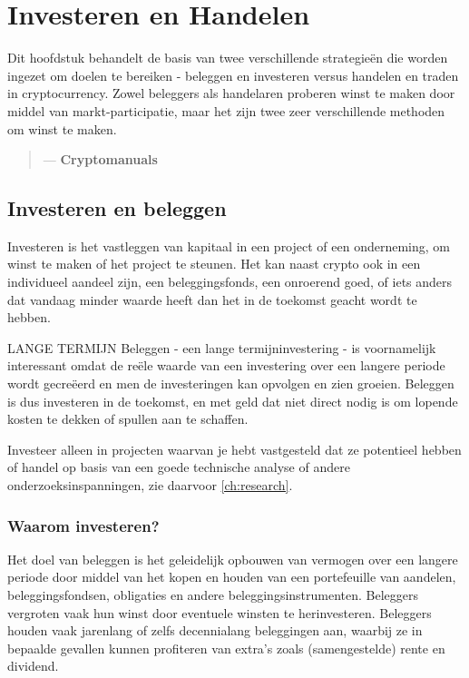 \chapter{Investeren en Handelen}
\label{ch:investing}

Dit hoofdstuk behandelt de basis van twee verschillende strategie\"en die worden ingezet om doelen te bereiken - beleggen en investeren versus handelen en traden in cryptocurrency. Zowel beleggers als handelaren proberen winst te maken door middel van markt-participatie, maar het zijn twee zeer verschillende methoden om winst te maken. 

    \medskip
    \begin{quotation}
          \textit{}
          \begin{flushright}
            \small{--- \textbf{Cryptomanuals}}
          \end{flushright}
    \end{quotation}
       \medskip
   

\section{Investeren en beleggen}
Investeren is het vastleggen van kapitaal in een project of een onderneming, om winst te maken of het project te steunen. Het kan naast crypto ook in een individueel aandeel zijn, een beleggingsfonds, een onroerend goed, of iets anders dat vandaag minder waarde heeft dan het in de toekomst geacht wordt te hebben. 

    \medskip
    \begin{cryptobox}{LANGE TERMIJN}
        Beleggen - een lange termijninvestering - is voornamelijk interessant omdat de re\"ele waarde van een investering over een langere periode wordt gecre\"eerd en men de investeringen kan opvolgen en zien groeien. Beleggen is dus investeren in de toekomst, en met geld dat niet direct nodig is om lopende kosten te dekken of spullen aan te schaffen.
    \end{cryptobox}
    \medskip
    
Investeer alleen in projecten waarvan je hebt vastgesteld dat ze potentieel hebben of handel op basis van een goede technische analyse of andere onderzoeksinspanningen, zie daarvoor \cref{ch:research}.

\subsection*{Waarom investeren?}
Het doel van beleggen is het geleidelijk opbouwen van vermogen over een langere periode door middel van het kopen en houden van een portefeuille van aandelen, beleggingsfondsen, obligaties en andere beleggingsinstrumenten. Beleggers vergroten vaak hun winst door eventuele winsten te herinvesteren. Beleggers houden vaak jarenlang of zelfs decennialang beleggingen aan, waarbij ze in bepaalde gevallen kunnen profiteren van extra's zoals (samengestelde) rente en dividend.

